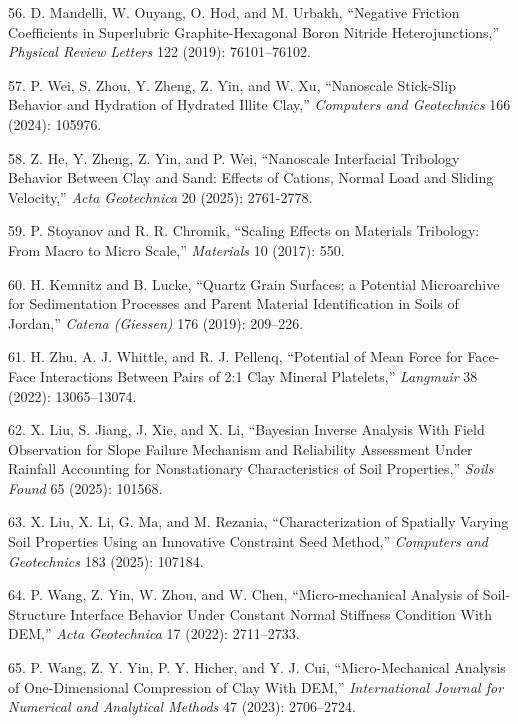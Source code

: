 \documentclass{article}
\begin{document}
\begin{hangpars}
56. D. Mandelli, W. Ouyang, O. Hod, and M. Urbakh, “Negative Friction Coefficients in Superlubric Graphite-Hexagonal Boron Nitride Heterojunctions,” \emph{Physical Review Letters} 122 (2019): 76101–76102.

57. P. Wei, S. Zhou, Y. Zheng, Z. Yin, and W. Xu, “Nanoscale Stick-Slip Behavior and Hydration of Hydrated Illite Clay,” \emph{Computers and Geotechnics} 166 (2024): 105976.

58. Z. He, Y. Zheng, Z. Yin, and P. Wei, “Nanoscale Interfacial Tribology Behavior Between Clay and Sand: Effects of Cations, Normal Load and Sliding Velocity,” \emph{Acta Geotechnica} 20 (2025): 2761-2778.

59. P. Stoyanov and R. R. Chromik, “Scaling Effects on Materials Tribology: From Macro to Micro Scale,” \emph{Materials} 10 (2017): 550.

60. H. Kemnitz and B. Lucke, “Quartz Grain Surfaces; a Potential Microarchive for Sedimentation Processes and Parent Material Identification in Soils of Jordan,” \emph{Catena (Giessen)} 176 (2019): 209–226.

61. H. Zhu, A. J. Whittle, and R. J. Pellenq, “Potential of Mean Force for Face-Face Interactions Between Pairs of 2:1 Clay Mineral Platelets,” \emph{Langmuir} 38 (2022): 13065–13074.

62. X. Liu, S. Jiang, J. Xie, and X. Li, “Bayesian Inverse Analysis With Field Observation for Slope Failure Mechanism and Reliability Assessment Under Rainfall Accounting for Nonstationary Characteristics of Soil Properties,” \emph{Soils Found} 65 (2025): 101568.

63. X. Liu, X. Li, G. Ma, and M. Rezania, “Characterization of Spatially Varying Soil Properties Using an Innovative Constraint Seed Method,” \emph{Computers and Geotechnics} 183 (2025): 107184.

64. P. Wang, Z. Yin, W. Zhou, and W. Chen, “Micro-mechanical Analysis of Soil-Structure Interface Behavior Under Constant Normal Stiffness Condition With DEM,” \emph{Acta Geotechnica} 17 (2022): 2711–2733.

65. P. Wang, Z. Y. Yin, P. Y. Hicher, and Y. J. Cui, “Micro-Mechanical Analysis of One-Dimensional Compression of Clay With DEM,” \emph{International Journal for Numerical and Analytical Methods} 47 (2023): 2706–2724.
\end{hangpars}
\end{document}
